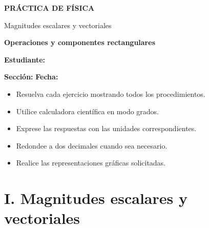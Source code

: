 \documentclass[11pt,letterpaper]{article}
\begin{document}
\begin{center}

{\Large\bfseries
\textcolor{azul}{
PRÁCTICA DE FÍSICA
}}

\vspace{0.15cm}

{\large
Magnitudes escalares y vectoriales
}

\vspace{0.2cm}

\textcolor{verde}{
\textbf{Operaciones y componentes rectangulares}
}

\end{center}

\begin{tcolorbox}[
 colback=gris,
 colframe=azul,
 arc=2mm
]

\textbf{Estudiante:}
\hrulefill

\vspace{0.3cm}

\textbf{Sección:}
\underline{\hspace{3cm}}
\hfill
\textbf{Fecha:}
\underline{\hspace{3cm}}

\end{tcolorbox}

\begin{tcolorbox}[
 colback=celeste,
 colframe=azul,
 title=Indicaciones
]

\begin{itemize}[leftmargin=*]
\item Resuelva cada ejercicio mostrando
todos los procedimientos.

\item Utilice calculadora científica
en modo grados.

\item Exprese las respuestas con
las unidades correspondientes.

\item Redondee a dos decimales
cuando sea necesario.

\item Realice las representaciones
gráficas solicitadas.
\end{itemize}

\end{tcolorbox}

\section*{I. Magnitudes escalares y vectoriales}
\end{document}

